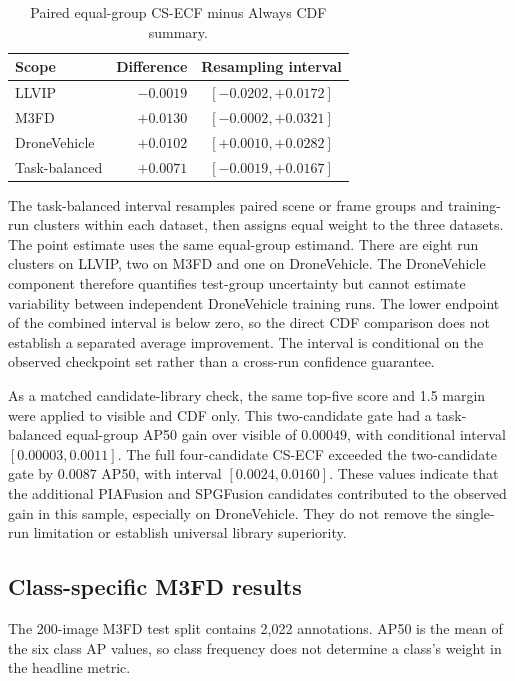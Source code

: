 \documentclass[11pt]{article}
\begin{document}
\begin{table}[h]
\centering
\small
\caption{Paired equal-group CS-ECF minus Always CDF summary.}
\begin{tabular}{@{}lrc@{}}
\toprule
Scope & Difference & Resampling interval \\
\midrule
LLVIP & \(-0.0019\) & \([-0.0202,+0.0172]\) \\
M3FD & \(+0.0130\) & \([-0.0002,+0.0321]\) \\
DroneVehicle & \(+0.0102\) & \([+0.0010,+0.0282]\) \\
Task-balanced & \(+0.0071\) & \([-0.0019,+0.0167]\) \\
\bottomrule
\end{tabular}
\end{table}

The task-balanced interval resamples paired scene or frame groups and
training-run clusters within each dataset, then assigns equal weight to the
three datasets. The point estimate uses the same equal-group estimand. There are
eight run clusters on LLVIP, two on M3FD and one on DroneVehicle. The
DroneVehicle component therefore quantifies test-group uncertainty but cannot
estimate variability between independent DroneVehicle training runs. The lower
endpoint of the combined interval is below zero, so the direct CDF comparison
does not establish a separated average improvement. The interval is conditional
on the observed checkpoint set rather than a cross-run confidence guarantee.

As a matched candidate-library check, the same top-five score and 1.5 margin
were applied to visible and CDF only. This two-candidate gate had a
task-balanced equal-group AP50 gain over visible of \(0.00049\), with conditional
interval \([0.00003,0.0011]\). The full four-candidate CS-ECF exceeded the
two-candidate gate by \(0.0087\) AP50, with interval \([0.0024,0.0160]\).
These values indicate that the additional PIAFusion and SPGFusion candidates
contributed to the observed gain in this sample, especially on DroneVehicle.
They do not remove the single-run limitation or establish universal library
superiority.

\subsection{Class-specific M3FD results}

The 200-image M3FD test split contains 2,022 annotations. AP50 is the mean of
the six class AP values, so class frequency does not determine a class's
weight in the headline metric.
\end{document}
